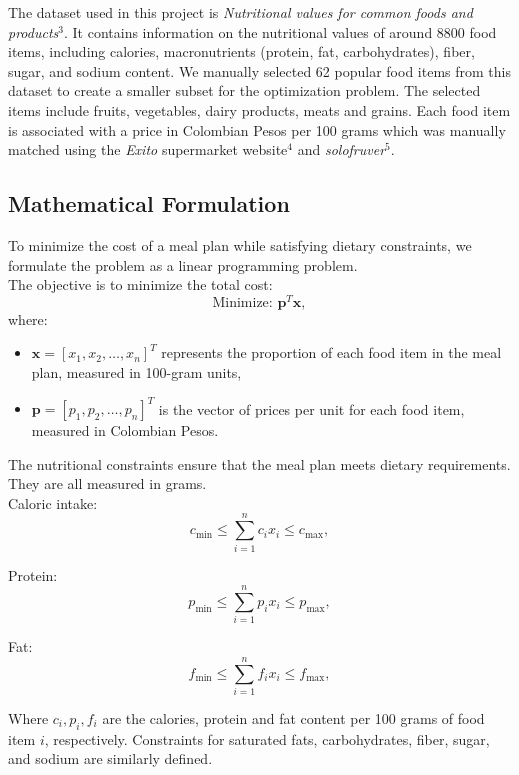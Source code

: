 \documentclass[10pt]{article}
\begin{document}
The dataset used in this project is \textit{Nutritional values for common foods and products}$^3$. It contains information on the nutritional values of around 8800 food items, including calories, macronutrients (protein, fat, carbohydrates), fiber, sugar, and sodium content. 
We manually selected 62 popular food items from this dataset to create a smaller subset for the optimization problem. The selected items include fruits, vegetables, dairy products, meats and grains. Each food item is associated with a price in Colombian Pesos per 100 grams which was 
manually matched using the \textit{Exito} supermarket website$^4$ and \textit{solofruver}$^5$. \\

\subsection{Mathematical Formulation}


To minimize the cost of a meal plan while satisfying dietary constraints, we formulate the problem as a linear programming problem.\\

The objective is to minimize the total cost:
\[
\text{Minimize: } \mathbf{p}^T \mathbf{x},
\]
where:
\begin{itemize}
    \item \( \mathbf{x} = [x_1, x_2, \ldots, x_n]^T \) represents the proportion of each food item in the meal plan, measured in 100-gram units,
    \item \( \mathbf{p} = [p_1, p_2, \ldots, p_n]^T \) is the vector of prices per unit for each food item, measured in Colombian Pesos.
\end{itemize}

The nutritional constraints ensure that the meal plan meets dietary requirements. They are all measured in grams.\\

Caloric intake:
\[
c_{\text{min}} \leq \sum_{i=1}^n c_i x_i \leq c_{\text{max}},
\]

Protein:
\[
p_{\text{min}} \leq \sum_{i=1}^n p_i x_i \leq p_{\text{max}},
\]

Fat:
\[
f_{\text{min}} \leq \sum_{i=1}^n f_i x_i \leq f_{\text{max}},
\]

Where \( c_i, p_i, f_i\) are the calories, protein and fat content per 100 grams of food item \( i \), respectively. Constraints for saturated fats, carbohydrates, fiber, sugar, and sodium are similarly defined.\\
\end{document}
